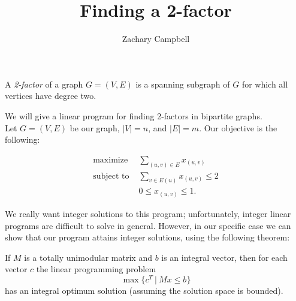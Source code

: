 \documentclass[11pt]{article}
\newenvironment{theorem}[2][Theorem]{\begin{trivlist}
\item[\hskip \labelsep {\bfseries #1}\hskip \labelsep {\bfseries #2.}]}{\end{trivlist}}
\newenvironment{definition}[2][Definition]{\begin{trivlist}
\item[\hskip \labelsep {\bfseries #1}\hskip \labelsep {\bfseries #2.}]}{\end{trivlist}}
\begin{document}
\title{Finding a 2-factor}
\author{Zachary Campbell}

\maketitle

\begin{definition}{(2-factor)}
	A \emph{2-factor} of a graph $G = (V,E)$ is a spanning subgraph of $G$ for which all 
	vertices have degree two.
\end{definition}

We will give a linear program for finding 2-factors in bipartite graphs.\\

Let $G = (V,E)$ be our graph, $|V| = n$, and $|E| = m$. Our objective is the following: 

\begin{align*}
	\text{maximize } &\sum_{(u,v)\in E} x_{(u,v)} \\
	\text{subject to } &\sum_{v\in E(u)} x_{(u,v)} \leq 2 \\
			   &0\leq x_{(u,v)} \leq 1.
\end{align*}

We really want integer solutions to this program; unfortunately, integer linear programs 
are difficult to solve in general. However, in our specific case we can show that our 
program attains integer solutions, using the following theorem:

\begin{theorem}{}
	If $M$ is a totally unimodular matrix and $b$ is an integral vector, then for 
	each vector $c$ the linear programming problem
	\[
		\max \{c^{T}\ |\ Mx\leq b \}
	\]
	has an integral optimum solution (assuming the solution space is bounded).
\end{theorem}
\end{document}
